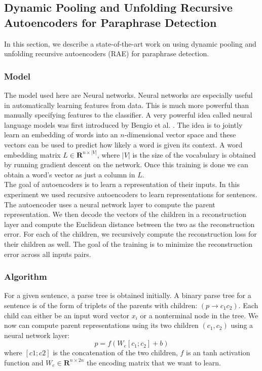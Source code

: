 \documentclass[conference]{IEEEtran}
\begin{document}
\subsection{Dynamic Pooling and Unfolding Recursive Autoencoders for Paraphrase Detection}
In this section, we describe a state-of-the-art work \cite{richard} on using dynamic pooling and unfolding recursive autoencoders (RAE) for paraphrase detection.\\
\subsubsection{Model}
The model used here are Neural networks. Neural networks are especially useful in automatically learning features from data. This is much more powerful than manually specifying features to the classifier. A very powerful idea called neural language models was first introduced by Bengio et al. \cite{bengio}. The idea is to jointly learn an embedding of words into an $n$-dimensional vector space and these vectors can be used to predict how likely a word is given its context. A word embedding matrix $L \in \mathbf{R}^{n \times |V|}$, where $|V|$ is the size of the vocabulary is obtained by running gradient descent on the network. Once this training is done we can obtain a word's vector as just a column in $L$.\\

The goal of autoencoders is to learn a representation of their inputs. In this experiment we used recursive autoencoders to learn representations for sentences. The autoencoder uses a neural network layer to compute the parent representation. We then decode the vectors of the children in a reconstruction layer and compute the Euclidean distance between the two as the reconstruction error. For each of the children, we recursively compute the reconstruction loss for their children as well. The goal of the training is to minimize the reconstruction error across all inputs pairs. 
\subsubsection{Algorithm}
For a given sentence, a parse tree is obtained initially. A binary parse tree for a sentence is of the form of triplets of the parents with children: $(p \rightarrow c_1c_2)$. Each child can either be an input word vector $x_i$ or a nonterminal node in the tree. We now can compute parent representations using its two children $(c_1, c_2)$ using a neural network layer:
\begin{equation}
p = f(W_e[c_1;c_2] + b)
\end{equation}
where $[c1;c2]$ is the concatenation of the two children, $f$ is an tanh activation function and $W_e \in \mathbf{R}^{n \times 2n}$ the encoding matrix that we want to learn.\\
\end{document}

